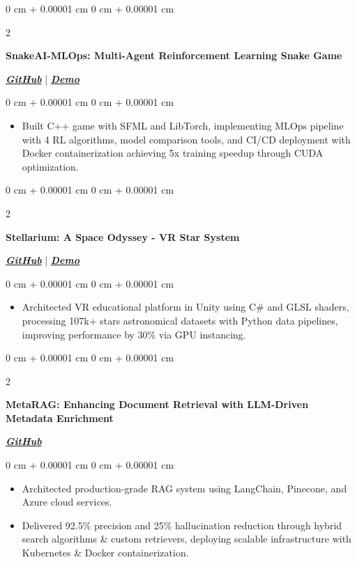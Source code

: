 \documentclass[10pt, letterpaper]{article}
\newenvironment{highlights}{
    \begin{itemize}[
        topsep=0.10 cm,
        parsep=0.10 cm,
        partopsep=0pt,
        itemsep=0pt,
        leftmargin=0 cm + 10pt
    ]
}{
    \end{itemize}
} %
\newenvironment{onecolentry}{
    \begin{adjustwidth}{
        0 cm + 0.00001 cm
    }{
        0 cm + 0.00001 cm
    }
}{
    \end{adjustwidth}
} %
\newenvironment{twocolentry}[2][]{
    \onecolentry
    \def\secondColumn{#2}
    \setcolumnwidth{\fill, 4.5 cm}
    \begin{paracol}{2}
}{
    \switchcolumn \raggedleft \secondColumn
    \end{paracol}
    \endonecolentry
} %
\begin{document}
\vspace{0.1 cm}


\begin{twocolentry}{
           \href{https://github.com/PranavMishra17/SnakeAI-MLOps}{\textbf{\textit{GitHub}}} | \href{https://pranavmishra17.github.io/SnakeAI-MLOps/}{\textbf{\textit{Demo}}}
       }
           \textbf{SnakeAI-MLOps: Multi-Agent Reinforcement Learning Snake Game}
\end{twocolentry}
\vspace{0.10 cm}
\begin{onecolentry}
   \begin{highlights}
\item Built C++ game with SFML and LibTorch, implementing MLOps pipeline with 4 RL algorithms, model comparison tools, and CI/CD deployment with Docker containerization achieving 5x training speedup through CUDA optimization.
   \end{highlights}
\end{onecolentry}
\vspace{0.1 cm}

\begin{twocolentry}{
           \href{https://github.com/PranavMishra17/Stellarium-VR}{\textbf{\textit{GitHub}}} | \href{https://portfolio-pranav-mishra-paranoid.vercel.app}{\textbf{\textit{Demo}}}
       }
           \textbf{Stellarium: A Space Odyssey - VR Star System}
\end{twocolentry}
\vspace{0.10 cm}
\begin{onecolentry}
   \begin{highlights}
\item Architected VR educational platform in Unity using C\# and GLSL shaders, processing 107k+ stars astronomical datasets with Python data pipelines, improving performance by 30\% via GPU instancing.
   \end{highlights}
\end{onecolentry}

\vspace{0.1 cm}

\begin{twocolentry}{
           \href{https://github.com/PranavMishra17/Metadata-Enrichment-with-LLMs-for-RAGs-Internal-Knowledge-Retrieval}{\textbf{\textit{GitHub}}}
       }
           \textbf{MetaRAG: Enhancing Document Retrieval with LLM-Driven Metadata Enrichment}
\end{twocolentry}
\vspace{0.1 cm}
\begin{onecolentry}
   \begin{highlights}
\item Architected production-grade RAG system using LangChain, Pinecone, and Azure cloud services.
   \end{highlights}
   \begin{highlights}
\item Delivered 92.5\% precision and 25\% hallucination reduction through hybrid search algorithms \& custom retrievers, deploying scalable infrastructure with Kubernetes \& Docker containerization.
   \end{highlights}
\end{onecolentry}
\end{document}
